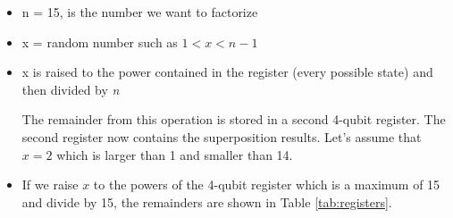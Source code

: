 \documentclass[conference, letterpaper]{IEEEtran}
\begin{document}
\begin{itemize}
\item n = 15, is the number we want to factorize
\item x = random number such as $1<x<n-1$
\item x is raised to the power contained in the register (every possible state) and then divided by \textit{n}

The remainder from this operation is stored in a second 4-qubit register. The second register now contains the superposition results. Let's assume that $x=2$ which is larger than 1 and smaller than 14. 

\item If we raise $x$ to the powers of the 4-qubit register which is a maximum of 15 and divide by 15, the remainders are shown in Table \ref{tab:registers}.


\end{itemize}
\end{document}
